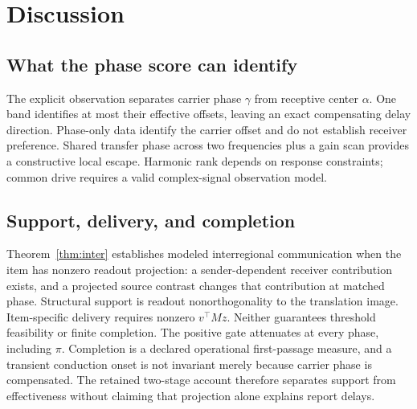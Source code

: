 \documentclass[submission,nolinenumbers]{esj}
\begin{document}



\section{Discussion}\label{sec:discussion}
\subsection{What the phase score can identify}
The explicit observation separates carrier phase $\gamma$ from receptive center $\alpha$. One band identifies at most their effective offsets, leaving an exact compensating delay direction. Phase-only data identify the carrier offset and do not establish receiver preference. Shared transfer phase across two frequencies plus a gain scan provides a constructive local escape. Harmonic rank depends on response constraints; common drive requires a valid complex-signal observation model.

\subsection{Support, delivery, and completion}
Theorem~\ref{thm:inter} establishes modeled interregional communication when the item has nonzero readout projection: a sender-dependent receiver contribution exists, and a projected source contrast changes that contribution at matched phase. Structural support is readout nonorthogonality to the translation image. Item-specific delivery requires nonzero $v^\top Mz$. Neither guarantees threshold feasibility or finite completion. The positive gate attenuates at every phase, including $\pi$. Completion is a declared operational first-passage measure, and a transient conduction onset is not invariant merely because carrier phase is compensated. The retained two-stage account therefore separates support from effectiveness without claiming that projection alone explains report delays.
\end{document}
